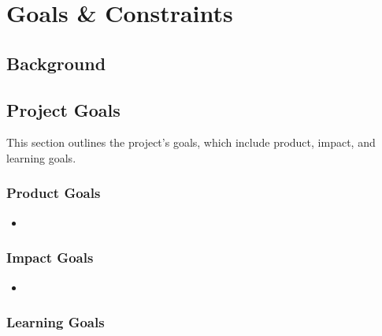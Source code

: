 \section{Goals \& Constraints}
\subsection{Background}


\subsection{Project Goals}
This section outlines the project's goals, which include product, impact, and learning goals.
\subsubsection{Product Goals}
\begin{itemize}
    \item 
\end{itemize}

\subsubsection{Impact Goals}
\begin{itemize}
    \item 
\end{itemize}

\subsubsection{Learning Goals}

